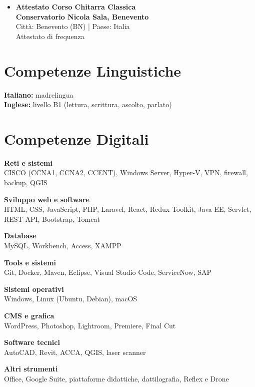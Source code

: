 \documentclass[a4paper,10pt]{article}
\begin{document}
\begin{itemize}[leftmargin=*]
  \item \textbf{\textcolor{mainblue}{Attestato Corso Chitarra Classica}}\\
  \textbf {Conservatorio Nicola Sala, Benevento \quad {[2005–2011]}}\\
  Città: Benevento (BN) | Paese: Italia\\
  Attestato di frequenza
\end{itemize}

\hrulefill

\section*{\faLanguage \quad Competenze Linguistiche}
\textbf{Italiano:} madrelingua\\
\textbf{Inglese:} livello B1 (lettura, scrittura, ascolto, parlato)

\hrulefill

\section*{\faCode \quad Competenze Digitali}
\begin{multicols}{2}
\textbf{\textcolor{mainblue}{Reti e sistemi}}\\
CISCO (CCNA1, CCNA2, CCENT), Windows Server, Hyper-V, VPN, firewall, backup, QGIS

\textbf{\textcolor{mainblue}{Sviluppo web e software}}\\
HTML, CSS, JavaScript, PHP, Laravel, React, Redux Toolkit, Java EE, Servlet, REST API, Bootstrap, Tomcat

\textbf{\textcolor{mainblue}{Database}}\\
MySQL, Workbench, Access, XAMPP

\textbf{\textcolor{mainblue}{Tools e sistemi}}\\
Git, Docker, Maven, Eclipse, Visual Studio Code, ServiceNow, SAP

\textbf{\textcolor{mainblue}{Sistemi operativi}}\\
Windows, Linux (Ubuntu, Debian), macOS

\textbf{\textcolor{mainblue}{CMS e grafica}}\\
WordPress, Photoshop, Lightroom, Premiere, Final Cut

\textbf{\textcolor{mainblue}{Software tecnici}}\\
AutoCAD, Revit, ACCA, QGIS, laser scanner

\textbf{\textcolor{mainblue}{Altri strumenti}}\\
Office, Google Suite, piattaforme didattiche, dattilografia, Reflex e Drone
\end{multicols}
\end{document}
